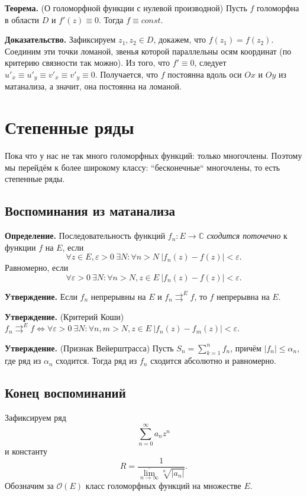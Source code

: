\textbf{Теорема.} (О голоморфной функции с нулевой производной) Пусть $f$ голоморфна в области $D$ и $f'(z) \equiv 0$.
Тогда $f \equiv const$.

\textbf{Доказательство.} Зафиксируем $z_1, z_2 \in D$, докажем, что $f(z_1) = f(z_2)$.
Соединим эти точки ломаной, звенья которой параллельны осям координат (по критерию связности так можно).
Из того, что $f' \equiv 0$, следует $u'_x \equiv u'_y \equiv v'_x \equiv v'_y \equiv 0$.
Получается, что $f$ постоянна вдоль оси $Ox$ и $Oy$ из матанализа, а значит, она постоянна на ломаной.

\QED

\section{Степенные ряды}
Пока что у нас не так много голоморфных функций: только многочлены.
Поэтому мы перейдём к более широкому классу: ``бесконечные`` многочлены, то есть степенные ряды.

\subsection{Воспоминания из матанализа}
\textbf{Определение.} Последовательность функций $f_n: E \to \mathbb C$ \textit{сходится поточечно} к функции $f$ на $E$, если
\[
    \forall z \in E, \varepsilon > 0~\exists N: \forall n > N~|f_n(z) - f(z)| < \varepsilon.
\]
Равномерно, если 
\[
    \forall \varepsilon > 0~\exists N: \forall n > N, z \in E~|f_n(z) - f(z)| < \varepsilon.
\]

\textbf{Утверждение.} Если $f_n$ непрерывны на $E$ и $f_n \rightrightarrows^E f$, то $f$ непрерывна на $E$.

\textbf{Утверждение.} (Критерий Коши) $f_n \rightrightarrows^E f \iff \forall \varepsilon > 0~\exists N: \forall n, m > N, z \in E~|f_n(z) - f_m(z)| < \varepsilon$.

\textbf{Утверждение.} (Признак Вейерштрасса) Пусть $S_n = \sum_{k=1}^{n} f_n$, причём $|f_n| \le \alpha_n$, где ряд из $\alpha_n$ сходится.
Тогда ряд из $f_n$ сходится абсолютно и равномерно.

\subsection{Конец воспоминаний}
Зафиксируем ряд
\begin{equation}
    \sum_{n=0}^{\infty} a_n z^n
\end{equation}
и константу
\[
    R = \frac{1}{\overline{\lim_{n \to \infty}} \sqrt[n]{|a_n|}}.
\]
Обозначим за $\mathcal O(E)$ класс голоморфных функций на множестве $E$.

